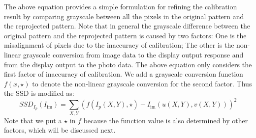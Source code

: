 \documentclass{report}
\begin{document}
The above equation provides a simple formulation for refining the calibration result by comparing grayscale between all the pixels in the original pattern and the reprojected pattern. Note that in general the grayscale difference between the original pattern and the reprojected pattern is caused by two factors: One is the misalignment of pixels due to the inaccuracy of calibration; The other is the non-linear grayscale conversion from image data to the display output response and from the display output to the photo data. The above equation only considers the first factor of inaccuracy of calibration. We add a grayscale conversion function $f(x, \star)$ to denote the non-linear grayscale conversion for the second factor. Thus the SSD is modified as: 
\begin{equation}
SSD_{I_p}(I_\text{im}) = \sum_{X, Y} \left( f(I_p(X, Y), \star) - I_\text{im}(u(X, Y), v(X, Y)) \right) ^2
\label{newSSDEqn}
\end{equation}
Note that we put a $\star$ in $f$ because the function value is also determined by other factors, which will be discussed next. 
\end{document}
